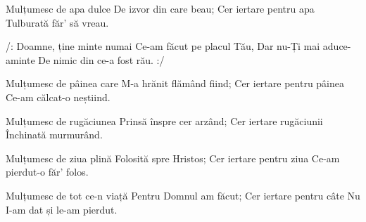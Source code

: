 \beginverse
Mulțumesc de apa dulce
De izvor din care beau;
Cer iertare pentru apa
Tulburată făr’ să vreau.
\endverse

\beginchorus
/: Doamne, ține minte numai
Ce-am făcut pe placul Tău,
Dar nu-Ți mai aduce-aminte
De nimic din ce-a fost rău. :/
\endchorus

\beginverse
Mulțumesc de pâinea care
M-a hrănit flămând fiind;
Cer iertare pentru pâinea
Ce-am călcat-o neștiind.
\endverse

\beginverse
Mulțumesc de rugăciunea
Prinsă înspre cer arzând;
Cer iertare rugăciunii
Închinată murmurând.
\endverse

\beginverse
Mulțumesc de ziua plină
Folosită spre Hristos;
Cer iertare pentru ziua
Ce-am pierdut-o făr’ folos.
\endverse

\beginverse
Mulțumesc de tot ce-n viață
Pentru Domnul am făcut;
Cer iertare pentru câte
Nu I-am dat și le-am pierdut.
\endverse
\endsong